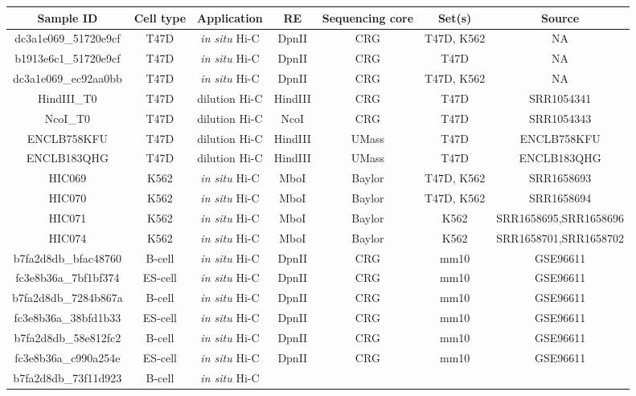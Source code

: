 \documentclass{bioinfo}
\begin{document}
\begin{methods}
\begin{table}
{\begin{tabular}{ccccccc}
  \toprule
  \textbf{Sample ID} & \textbf{Cell type} & \textbf{Application} &
  \textbf{RE} & \textbf{Sequencing core} & \textbf{Set(s)} &
  \textbf{Source} \\
  \midrule
dc3a1e069\_51720e9cf & T47D & \textit{in situ} Hi-C &
  DpnII & CRG & T47D, K562 & NA \\
b1913e6c1\_51720e9cf & T47D & \textit{in situ} Hi-C &
  DpnII & CRG & T47D & NA \\
dc3a1e069\_ec92aa0bb & T47D & \textit{in situ} Hi-C &
  DpnII & CRG & T47D, K562 & NA \\
HindIII\_T0 & T47D & dilution Hi-C &
  HindIII & CRG & T47D & SRR1054341 \\
NcoI\_T0    & T47D & dilution Hi-C &
  NcoI      & CRG & T47D & SRR1054343 \\
ENCLB758KFU & T47D & dilution Hi-C &
  HindIII   & UMass & T47D & ENCLB758KFU \\
ENCLB183QHG & T47D & dilution Hi-C &
  HindIII   & UMass & T47D & ENCLB183QHG \\
HIC069  & K562 & \textit{in situ} Hi-C &
  MboI & Baylor & T47D, K562 &    SRR1658693 \\
HIC070  & K562 & \textit{in situ} Hi-C &
  MboI & Baylor & T47D, K562 &    SRR1658694 \\
HIC071  & K562 & \textit{in situ} Hi-C &
  MboI & Baylor & K562 & SRR1658695,SRR1658696 \\
HIC074  & K562 & \textit{in situ} Hi-C &
  MboI & Baylor & K562 & SRR1658701,SRR1658702 \\
b7fa2d8db\_bfac48760 & B-cell  & \textit{in situ} Hi-C &
  DpnII & CRG & mm10 & GSE96611 \\
fc3e8b36a\_7bf1bf374 & ES-cell & \textit{in situ} Hi-C &
  DpnII & CRG & mm10 & GSE96611 \\
b7fa2d8db\_7284b867a & B-cell  & \textit{in situ} Hi-C &
  DpnII & CRG & mm10 & GSE96611 \\
fc3e8b36a\_38bfd1b33 & ES-cell & \textit{in situ} Hi-C &
  DpnII & CRG & mm10 & GSE96611 \\
b7fa2d8db\_58e812fc2 & B-cell  & \textit{in situ} Hi-C &
  DpnII & CRG & mm10 & GSE96611 \\
fc3e8b36a\_c990a254e & ES-cell & \textit{in situ} Hi-C &
  DpnII & CRG & mm10 & GSE96611 \\
b7fa2d8db\_73f11d923 & B-cell  & \textit{in situ} Hi-C &

\end{tabular}}
\end{table}
\end{methods}
\end{document}
